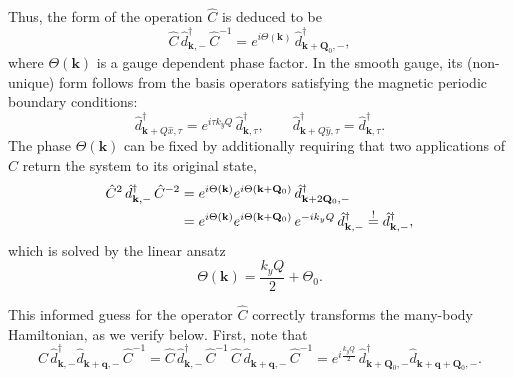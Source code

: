 Thus, the form of the operation $\hat{C}$ is deduced to be
\begin{equation}
    \hat{C}\, \hat{d}^\dagger_{\mathbf{k},-}\, \hat{C}^{-1} = e^{i\Theta(\mathbf{k})}\, \hat{d}^\dagger_{\mathbf{k} + \mathbf{Q}_0,-},
    \label{eq:C-action}
\end{equation}
where $\Theta(\mathbf{k})$ is a gauge dependent phase factor. In the smooth gauge, its (non-unique) form follows from the basis operators satisfying the magnetic periodic boundary conditions:
\begin{equation}
    \hat{d}_{\mathbf{k}+Q\hat{x},\tau}^\dagger = e^{i\tau k_y Q}\, \hat{d}_{\mathbf{k},\tau}^\dagger,
    \qquad
    \hat{d}_{\mathbf{k}+Q\hat{y},\tau}^\dagger = \hat{d}_{\mathbf{k},\tau}^\dagger.
    \label{eq:mbc}
\end{equation}
The phase $\Theta(\mathbf{k})$ can be fixed by additionally requiring that two applications of $\hat{C}$ return the system to its original state,
\begin{align}
    \hat{C}^2\, \hat{d}^\dagger_{\mathbf{k},-}\, \hat{C}^{-2}
    &= e^{i\Theta(\mathbf{k})} e^{i\Theta(\mathbf{k} + \mathbf{Q}_0)}\, \hat{d}^\dagger_{\mathbf{k} + 2\mathbf{Q}_0,-} \notag \\
    &= e^{i\Theta(\mathbf{k})} e^{i\Theta(\mathbf{k} + \mathbf{Q}_0)}\, e^{-ik_y Q}\, \hat{d}^\dagger_{\mathbf{k},-}
    \overset{!}{=} \hat{d}^\dagger_{\mathbf{k},-},
    \label{eq:closure}
\end{align}
which is solved by the linear ansatz
\begin{equation}
    \Theta(\mathbf{k}) = \frac{k_y Q}{2} + \Theta_0.
    \label{eq:theta}
\end{equation}

This informed guess for the operator $\hat{C}$ correctly transforms the many-body Hamiltonian, as we verify below. First, note that
\begin{equation}
    \hat{C}\, \hat{d}_{\mathbf{k},-}^\dagger \hat{d}_{\mathbf{k} + \mathbf{q},-}\, \hat{C}^{-1}
    = \hat{C}\, \hat{d}_{\mathbf{k},-}^\dagger\, \hat{C}^{-1} \, \hat{C}\, \hat{d}_{\mathbf{k} + \mathbf{q},-}\, \hat{C}^{-1}
    = e^{i \frac{k_y Q}{2}}\, \hat{d}_{\mathbf{k} + \mathbf{Q}_0,-}^\dagger \hat{d}_{\mathbf{k} + \mathbf{q} + \mathbf{Q}_0,-}.
    \label{eq:bilinear}
\end{equation}

